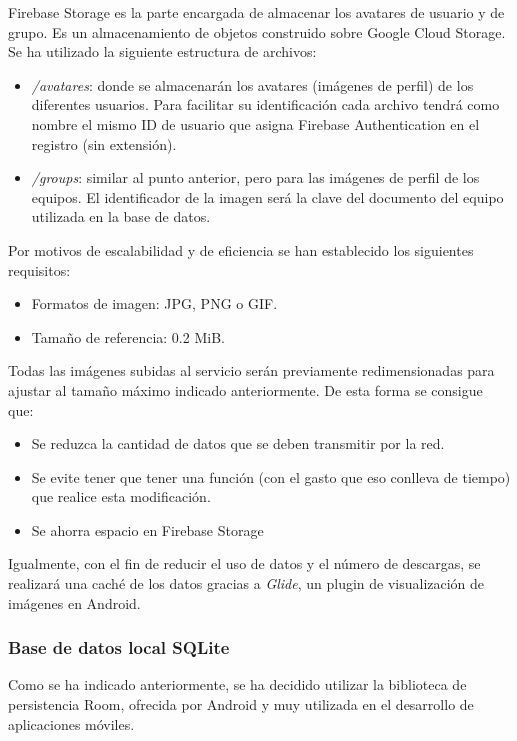 \documentclass[twoside]{report}
\begin{document}
Firebase Storage es la parte encargada de almacenar los avatares de usuario y de grupo. Es un almacenamiento de objetos construido sobre Google Cloud Storage. \\

Se ha utilizado la siguiente estructura de archivos:
\begin{itemize}
\item \textit{/avatares}: donde se almacenarán los avatares (imágenes de perfil) de los diferentes usuarios. Para facilitar su identificación cada archivo tendrá como nombre el mismo ID de usuario que asigna Firebase Authentication en el registro (sin extensión). 
\item \textit{/groups}: similar al punto anterior, pero para las imágenes de perfil de los equipos. El identificador de la imagen será la clave del documento del equipo utilizada en la base de datos.
\end{itemize}

Por motivos de escalabilidad y de eficiencia se han establecido los siguientes requisitos:
\begin{itemize}
\item Formatos de imagen: JPG, PNG o GIF.
\item Tamaño de referencia: 0.2 MiB.
\end{itemize}

Todas las imágenes subidas al servicio serán previamente redimensionadas para ajustar al tamaño máximo indicado anteriormente. De esta forma se consigue que:

\begin{itemize}
\item Se reduzca la cantidad de datos que se deben transmitir por la red.
\item Se evite tener que tener una función (con el gasto que eso conlleva de tiempo) que realice esta modificación.
\item Se ahorra espacio en Firebase Storage
\end{itemize}

Igualmente, con el fin de reducir el uso de datos y el número de descargas, se realizará una caché de los datos gracias a \textit{Glide}, un plugin de visualización de imágenes en Android.

\subsubsection{Base de datos local SQLite}

Como se ha indicado anteriormente, se ha decidido utilizar la biblioteca de persistencia Room, ofrecida por Android y muy utilizada en el desarrollo de aplicaciones móviles.
\end{document}
